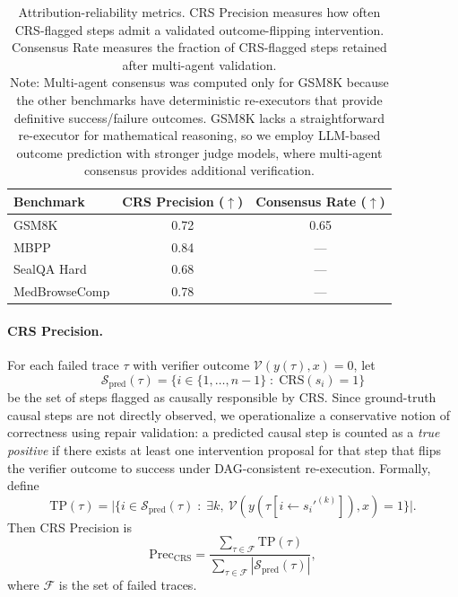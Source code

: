 \documentclass{article}
\theoremstyle{plain}
\theoremstyle{definition}
\theoremstyle{remark}
\begin{document}
\begin{table}[!t]
\caption{Attribution-reliability metrics. CRS Precision measures how often CRS-flagged steps admit a validated outcome-flipping intervention. Consensus Rate measures the fraction of CRS-flagged steps retained after multi-agent validation.
\\
Note: Multi-agent consensus was computed only for GSM8K because the other benchmarks have deterministic re-executors that provide definitive success/failure outcomes. GSM8K lacks a straightforward re-executor for mathematical reasoning, so we employ LLM-based outcome prediction with stronger judge models, where multi-agent consensus provides additional verification.}
\label{tab:attrib_metrics}
\centering
\begin{small}
\begin{tabular}{lcc}
\toprule
Benchmark & CRS Precision ($\uparrow$) & Consensus Rate ($\uparrow$) \\
\midrule
GSM8K & 0.72 & 0.65 \\
MBPP & 0.84 & --- \\
SealQA Hard & 0.68 & --- \\
MedBrowseComp & 0.78 & --- \\
\bottomrule
\end{tabular}
\end{small}
\end{table}

\paragraph{CRS Precision.}
For each failed trace $\tau$ with verifier outcome $\mathcal{V}(y(\tau),x)=0$, let
\[
\mathcal{S}_{\mathrm{pred}}(\tau) = \{ i \in \{1,\dots,n-1\} \;:\; \mathrm{CRS}(s_i)=1 \}
\]
be the set of steps flagged as causally responsible by CRS. Since ground-truth causal steps are not directly observed, we operationalize a conservative notion of correctness using repair validation: a predicted causal step is counted as a \emph{true positive} if there exists at least one intervention proposal for that step that flips the verifier outcome to success under DAG-consistent re-execution.
Formally, define
\[
\mathrm{TP}(\tau) = \big|\{ i \in \mathcal{S}_{\mathrm{pred}}(\tau) \;:\; \exists k,\ \mathcal{V}(y(\tau[i \leftarrow s_i'^{(k)}]),x)=1 \}\big|.
\]
Then CRS Precision is
\[
\mathrm{Prec}_{\mathrm{CRS}} = 
\frac{\sum_{\tau \in \mathcal{F}} \mathrm{TP}(\tau)}
{\sum_{\tau \in \mathcal{F}} |\mathcal{S}_{\mathrm{pred}}(\tau)|},
\]
where $\mathcal{F}$ is the set of failed traces.
\end{document}
